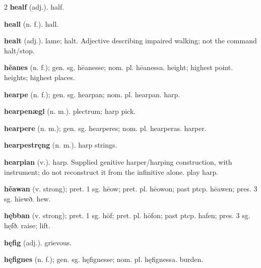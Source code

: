 \begin{multicols*}{2}
\textbf{healf} (adj.). half.\par
\textbf{heall} (n. f.). hall.\par
\textbf{healt} (adj.). lame; halt. Adjective describing impaired walking; not the command halt/stop.\par
\textbf{hēanes} (n. f.); gen. sg. hēanesse; nom. pl. hēanessa. height; highest point. heights; highest places.\par
\textbf{hearpe} (n. f.); gen. sg. hearpan; nom. pl. hearpan. harp.\par
\textbf{hearpenægl} (n. m.). plectrum; harp pick.\par
\textbf{hearpere} (n. m.); gen. sg. hearperes; nom. pl. hearperas. harper.\par
\textbf{hearpestręng} (n. m.). harp strings.\par
\textbf{hearpian} (v.). harp. Supplied genitive harper/harping construction, with instrument; do not reconstruct it from the infinitive alone. play harp.\par
\textbf{hēawan} (v. strong); pret. 1 sg. hēow; pret. pl. hēowon; past ptcp. hēawen; pres. 3 sg. hīewð. hew.\par
\textbf{hębban} (v. strong); pret. 1 sg. hōf; pret. pl. hōfon; past ptcp. hafen; pres. 3 sg. hęfð. raise; lift.\par
\textbf{hęfig} (adj.). grievous.\par
\textbf{hęfignes} (n. f.); gen. sg. hęfignesse; nom. pl. hęfignessa. burden.\par

\end{multicols*}
